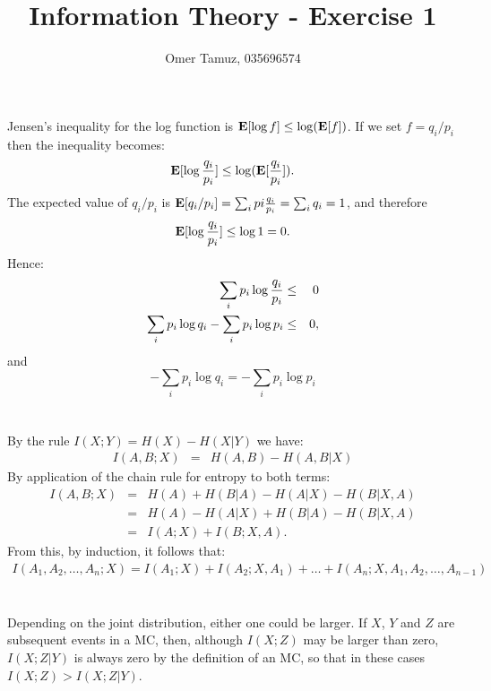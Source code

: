 \documentclass[11pt]{article} \usepackage{amssymb}
\newcommand{\E}{{\bf E}} \newcommand{\Cov}{{\bf Cov}}
\begin{document}
\title{Information Theory - Exercise 1}

 \author{Omer Tamuz, 035696574}
\maketitle

\section{}
Jensen's inequality for the log function is $\E[\log f] \leq \log(\E[f])$. If we set
$f=q_i/p_i$ then the inequality becomes:
\begin{equation*}
  \E[\log {q_i \over p_i}] \leq \log(\E[{q_i\over p_i}]).
\end{equation*}
The expected value of $q_i/p_i$ is 
$\E[q_i/p_i]=\sum_ipi{q_i\over p_i}=\sum_iq_i=1$, and therefore
\begin{equation*}
  \E[\log {q_i \over p_i}] \leq \log 1 = 0.
\end{equation*}
Hence:
\begin{eqnarray*}
  \sum_ip_i\log{q_i\over p_i}&\leq&0\\
  \sum_ip_i\log q_i-\sum_ip_i\log p_i&\leq&0,
\end{eqnarray*}
and
\begin{equation*}
  -\sum_ip_i\log q_i=-\sum_ip_i\log p_i  
\end{equation*}
\section{}
By the rule $I(X;Y)=H(X)-H(X|Y)$ we have:
\begin{eqnarray*}
  I(A,B;X)
  &=&H(A,B)-H(A,B|X)
\end{eqnarray*}
By application of the chain rule for entropy to both terms:
\begin{eqnarray*}
  I(A,B;X)
  &=&H(A)+H(B|A)-H(A|X)-H(B|X,A)\\
  &=&H(A)-H(A|X)+H(B|A)-H(B|X,A)\\
  &=&I(A;X)+I(B;X,A).
\end{eqnarray*}
From this, by induction, it follows that:
\begin{eqnarray*}
  I(A_1,A_2,\ldots,A_n;X)=I(A_1;X)+I(A_2;X,A_1)+\dots+I(A_n;X,A_1,A_2,\ldots,A_{n-1})
\end{eqnarray*}

\section{}
Depending on the joint distribution, either one could be larger. If $X$,
$Y$ and $Z$ are subsequent events in a MC, then, although $I(X;Z)$ may
be larger than zero, $I(X;Z|Y)$ is always zero by the definition of an
MC, so that in these cases $I(X;Z)>I(X;Z|Y)$.
\end{document}
